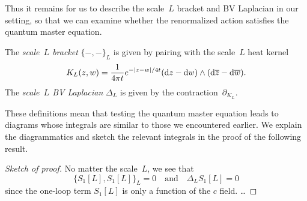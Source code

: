 Thus it remains for us to describe the scale~$L$ bracket and BV Laplacian in our setting,
so that we can examine whether the renormalized action satisfies the quantum master equation.

\begin{dfn}
The {\em scale~$L$ bracket} $\{-,-\}_L$ is given by pairing with the scale~$L$ heat kernel
\[
K_L(z,w) = \frac{1}{4\pi t} e^{-|z-w|/4t} ({\rm d} z - {\rm d} w) \wedge ({\rm d}\overline{z} - {\rm d}\overline{w}). 
\]
The {\em scale~$L$ BV Laplacian} $\Delta_L$ is given by the contraction~$\partial_{K_L}$.
\end{dfn}

These definitions mean that testing the quantum master equation leads to diagrams whose integrals are similar to those we encountered earlier.
We explain the diagrammatics and sketch the relevant integrals in the proof of the following result.

\begin{prop}
\end{prop}

\begin{proof}[Sketch of proof]
No matter the scale~$L$, we see that
\[
\{S_1[L],S_1[L]\}_L = 0 \quad\text{and}\quad \Delta_L S_1[L] = 0
\]
since the one-loop term $S_1[L]$ is only a function of the $c$ field.
\dots
\end{proof}
